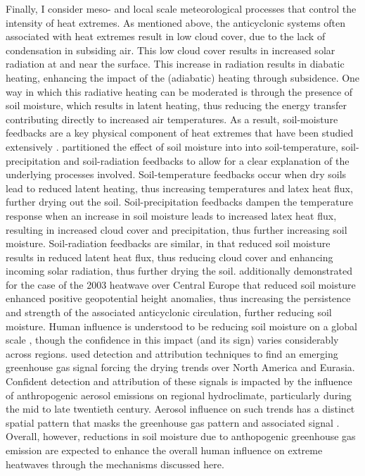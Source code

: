   Finally, I consider meso- and local scale meteorological processes that control the intensity of heat extremes. As mentioned above, the anticyclonic systems often associated with heat extremes result in low cloud cover, due to the lack of condensation in subsiding air. This low cloud cover results in increased solar radiation at and near the surface. This increase in radiation results in diabatic heating, enhancing the impact of the (adiabatic) heating through subsidence. One way in which this radiative heating can be moderated is through the presence of soil moisture, which results in latent heating, thus reducing the energy transfer contributing directly to increased air temperatures. As a result, soil-moisture feedbacks are a key physical component of heat extremes that have been studied extensively \citep{horton_review_2016,wehrli_identifying_2019,zeppetello_physics_2022,vogel_varying_2018,fischer_contribution_2007,fischer_soil_2007,miralles_mega-heatwave_2014,sousa_distinct_2020}. \citet{vogel_varying_2018} partitioned the effect of soil moisture into into soil-temperature, soil-precipitation and soil-radiation feedbacks to allow for a clear explanation of the underlying processes involved. Soil-temperature feedbacks occur when dry soils lead to reduced latent heating, thus increasing temperatures and latex heat flux, further drying out the soil. Soil-precipitation feedbacks dampen the temperature response when an increase in soil moisture leads to increased latex heat flux, resulting in increased cloud cover and precipitation, thus further increasing soil moisture. Soil-radiation feedbacks are similar, in that reduced soil moisture results in reduced latent heat flux, thus reducing cloud cover and enhancing incoming solar radiation, thus further drying the soil. \citet{fischer_soil_2007} additionally demonstrated for the case of the 2003 heatwave over Central Europe that reduced soil moisture enhanced positive geopotential height anomalies, thus increasing the persistence and strength of the associated anticyclonic circulation, further reducing soil moisture. Human influence is understood to be reducing soil moisture on a global scale \citep{gu_attribution_2019}, though the confidence in this impact (and its sign) varies considerably across regions. \citet{marvel_twentieth-century_2019} used detection and attribution techniques to find an emerging greenhouse gas signal forcing the drying trends over North America and Eurasia. Confident detection and attribution of these signals is impacted by the influence of anthropogenic aerosol emissions on regional hydroclimate, particularly during the mid to late twentieth century. Aerosol influence on such trends has a distinct spatial pattern that masks the greenhouse gas pattern and associated signal \citep{bonfils_human_2020}. Overall, however, reductions in soil moisture due to anthopogenic greenhouse gas emission are expected to enhance the overall human influence on extreme heatwaves through the mechanisms discussed here.

